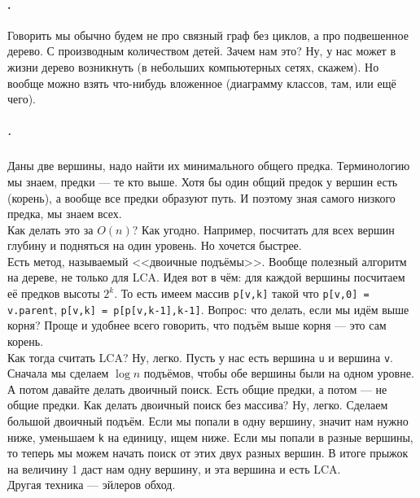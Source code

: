 \documentclass{article}
\newcommand{\pseudo}{PseudoLexer.py:PseudoLexer -x}
\newcommand{\pseudocode}[1]{\texttt{#1}}
\begin{document}
    \paragraph{.}
    Говорить мы обычно будем не про связный граф без циклов, а про подвешенное дерево. С производным количеством детей. Зачем нам это? Ну, у нас может в жизни дерево возникнуть (в небольших компьютерных сетях, скажем). Но вообще можно взять что-нибудь вложенное (диаграмму классов, там, или ещё чего).
    \subparagraph{.}
    Даны две вершины, надо найти их минимального общего предка. Терминологию мы знаем, предки --- те кто выше. Хотя бы один общий предок у вершин есть (корень), а вообще все предки образуют путь. И поэтому зная самого низкого предка, мы знаем всех.\\
    Как делать это за $O(n)$? Как угодно. Например, посчитать для всех вершин глубину и подняться на один уровень. Но хочется быстрее.\\
    Есть метод, называемый <<двоичные подъёмы>>. Вообще полезный алгоритм на дереве, не только для LCA. Идея вот в чём: для каждой вершины посчитаем её предков высоты $2^k$. То есть имеем массив \pseudocode{p[v,k]} такой что \pseudocode{p[v,0] = v.parent}, \pseudocode{p[v,k] = p[p[v,k-1],k-1]}. Вопрос: что делать, если мы идём выше корня? Проще и удобнее всего говорить, что подъём выше корня --- это сам корень.\\
    Как тогда считать LCA? Ну, легко. Пусть у нас есть вершина \pseudocode{u} и вершина \pseudocode{v}. Сначала мы сделаем $\log n$ подъёмов, чтобы обе вершины были на одном уровне. А потом давайте делать двоичный поиск. Есть общие предки, а потом --- не общие предки. Как делать двоичный поиск без массива? Ну, легко. Сделаем большой двоичный подъём. Если мы попали в одну вершину, значит нам нужно ниже, уменьшаем \pseudocode{k} на единицу, ищем ниже. Если мы попали в разные вершины, то теперь мы можем начать поиск от этих двух разных вершин. В итоге прыжок на величину 1 даст нам одну вершину, и эта вершина и есть LCA.\\
    Другая техника --- эйлеров обход.
    \begin{figure}[H]
    \end{figure}\noindent
\end{document}
